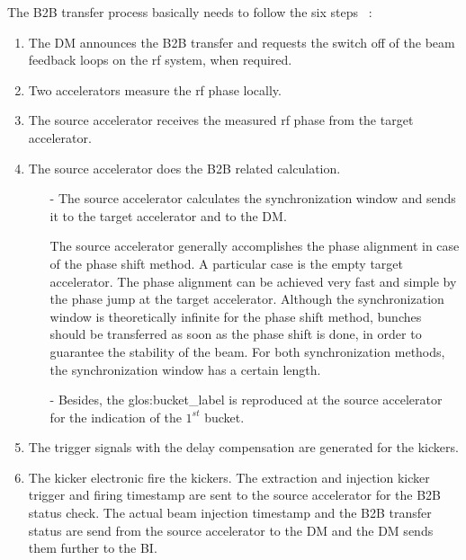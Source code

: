 The B2B transfer process basically needs to follow the six steps ~\cite{bai_bunch_2015}:
\begin{enumerate}
\item The DM announces the B2B transfer and requests the switch off of the beam feedback loops on the rf system, when required.
\item Two accelerators measure the rf phase locally.
\item The source accelerator receives the measured rf phase from the target accelerator.
\item The source accelerator does the B2B related calculation.
\begin{enumerate}
\item[-] The source accelerator calculates the synchronization window and sends it to the target accelerator and to the DM. 

The source accelerator generally accomplishes the phase alignment in case of the phase shift method. A particular case is the empty target accelerator. The phase alignment can be achieved very fast and simple by the phase jump at the target accelerator. Although the synchronization window is theoretically infinite for the phase shift method, bunches should be transferred as soon as the phase shift is done, in order to guarantee the stability of the beam. For both synchronization methods, the synchronization window has a certain length.

\item[-] Besides, the \gls{glos:bucket_label} is reproduced at the source accelerator for the indication of the $1^\mathit{st}$ bucket.
\end{enumerate}
\item The trigger signals with the delay compensation are generated for the kickers.
\item The kicker electronic fire the kickers. The extraction and injection kicker trigger and firing timestamp are sent to the source accelerator for the B2B status check. The actual beam injection timestamp and the B2B transfer status are send from the source accelerator to the DM and the DM sends them further to the BI.

\end{enumerate}



